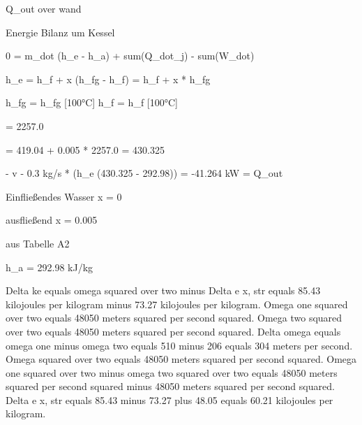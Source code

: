 Q_out over wand

Energie Bilanz um Kessel

0 = m_dot (h_e - h_a) + sum(Q_dot_j) - sum(W_dot)

h_e = h_f + x (h_fg - h_f) = h_f + x * h_fg

h_fg = h_fg [100°C]  h_f = h_f [100°C]

= 2257.0

= 419.04 + 0.005 * 2257.0 = 430.325

- v - 0.3 kg/s * (h_e (430.325 - 292.98)) = -41.264 kW = Q_out

Einfließendes Wasser x = 0

ausfließend x = 0.005

aus Tabelle A2

h_a = 292.98 kJ/kg

Delta ke equals omega squared over two minus Delta e x, str equals 85.43 kilojoules per kilogram minus 73.27 kilojoules per kilogram. Omega one squared over two equals 48050 meters squared per second squared. Omega two squared over two equals 48050 meters squared per second squared. Delta omega equals omega one minus omega two equals 510 minus 206 equals 304 meters per second. Omega squared over two equals 48050 meters squared per second squared. Omega one squared over two minus omega two squared over two equals 48050 meters squared per second squared minus 48050 meters squared per second squared. Delta e x, str equals 85.43 minus 73.27 plus 48.05 equals 60.21 kilojoules per kilogram.